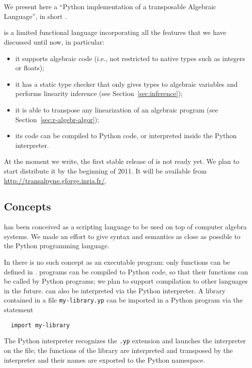 

\section{\tALpy{}}
\label{sec:texttttransalpyne}

\lstset{language=python}

We present here a ``Python implementation of a transposable Algebraic
Language'', in short \tALpy{}.

\tALpy{} is a limited functional language incorporating all the
features that we have discussed until now, in particular:
\begin{itemize}
\item it supports algebraic code (i.e., not restricted to native types
  such as integers or floats);
\item it has a static type checker that only gives types to algebraic
  variables and performs linearity inference (see
  Section~\ref{sec:inference});
\item it is able to transpose any linearization of an algebraic
  program (see Section~\ref{sec:r-algebr-algor});
\item its code can be compiled to Python code, or interpreted inside
  the Python interpreter.
\end{itemize}

At the moment we write, the first stable release of \tALpy{} is not
ready yet. We plan to start distribute it by the beginning of 2011. It
will be available from \url{http://transalpyne.gforge.inria.fr/}.


\subsection{Concepts}
\tALpy{} has been conceived as a scripting language to be used on top
of computer algebra systems. We made an effort to give syntax and
semantics as close as possible to the Python programming language.

In \tALpy{} there is no such concept as an executable program: only
functions can be defined in \tALpy{}.  \tALpy{} programs can be
compiled to Python code, so that their functions can be called by
Python programs; we plan to support compilation to other languages in
the future. \tALpy{} can also be interpreted via the Python
interpreter. A \tALpy{} library contained in a file
\texttt{my-library.yp} can be imported in a Python program via the
statement
\begin{lstlisting}
  import my-library
\end{lstlisting}
The Python interpreter recognizes the \texttt{.yp} extension and
launches the \tALpy{} interpreter on the file; the functions of the
library are interpreted and transposed by the \tALpy{} interpreter and
their names are exported to the Python namespace.

